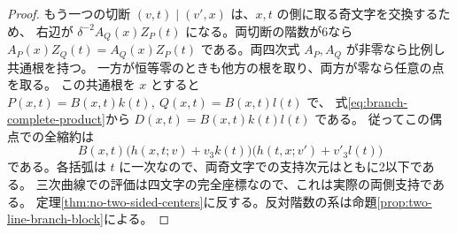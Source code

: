 \begin{proof}
もう一つの切断 $(v,t)\mid(v',x)$ は、$x,t$ の側に取る奇文字を交換するため、
右辺が $\delta^{-2} A_Q(x) Z_P(t)$ になる。両切断の階数が6なら
$A_P(x)Z_Q(t)=A_Q(x)Z_P(t)$ である。両四次式 $A_P,A_Q$ が非零なら比例し共通根を持つ。
一方が恒等零のときも他方の根を取り、両方が零なら任意の点を取る。
この共通根を $x$ とすると $P(x,t)=B(x,t)k(t),\ Q(x,t)=B(x,t)l(t)$ で、
式\eqref{eq:branch-complete-product}から $D(x,t)=B(x,t)k(t)l(t)$ である。
従ってこの偶点での全縮約は
\[
       B(x,t)\big(h(x,t;v)+v_3 k(t)\big)
               \big(h(t,x;v')+v'_3 l(t)\big)
\]
である。各括弧は $t$ に一次なので、両奇文字での支持次元はともに2以下である。
三次曲線での評価は四文字の完全座標なので、これは実際の両側支持である。
定理\ref{thm:no-two-sided-centers}に反する。反対階数の系は命題\ref{prop:two-line-branch-block}による。
\end{proof}
